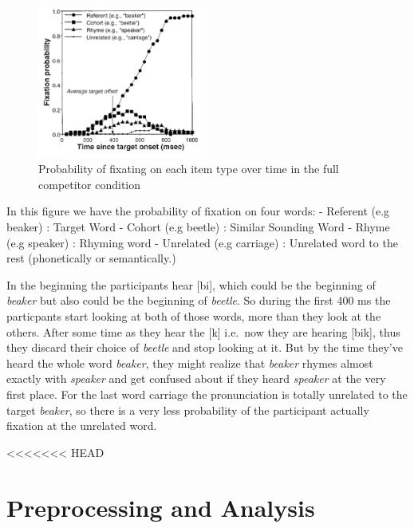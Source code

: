 \documentclass[
  a4paper,
]{article}
\begin{document}
\begin{figure}

{\centering \includegraphics[width=0.5\textwidth,height=\textheight]{img/ref_graph.png}

}

\caption{\label{fig-matrix}Probability of fixating on each item type
over time in the full competitor condition}

\end{figure}

In this figure we have the probability of fixation on four words: -
Referent (e.g beaker) : Target Word - Cohort (e.g beetle) : Similar
Sounding Word - Rhyme (e.g speaker) : Rhyming word - Unrelated (e.g
carriage) : Unrelated word to the rest (phonetically or semantically.)

In the beginning the participants hear {[}bi{]}, which could be the
beginning of \emph{beaker} but also could be the beginning of
\emph{beetle}. So during the first 400 ms the particpants start looking
at both of those words, more than they look at the others. After some
time as they hear the {[}k{]} i.e.~now they are hearing {[}bik{]}, thus
they discard their choice of \emph{beetle} and stop looking at it. But
by the time they've heard the whole word \emph{beaker}, they might
realize that \emph{beaker} rhymes almost exactly with \emph{speaker} and
get confused about if they heard \emph{speaker} at the very first place.
For the last word carriage the pronunciation is totally unrelated to the
target \emph{beaker}, so there is a very less probability of the
participant actually fixation at the unrelated word.

<<<<<<< HEAD
\hypertarget{preprocessing-and-analysis}{%
\section{Preprocessing and Analysis}\label{preprocessing-and-analysis}}
\end{document}
